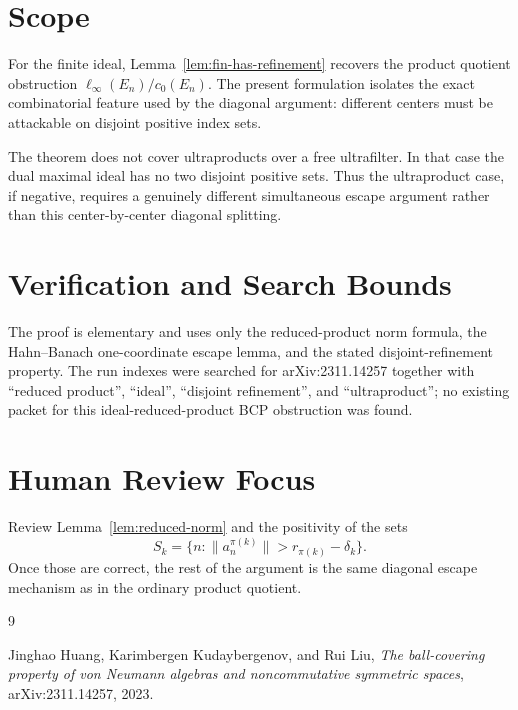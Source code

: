 \documentclass[11pt]{article}
\begin{document}
\section*{Scope}

For the finite ideal, Lemma~\ref{lem:fin-has-refinement} recovers the product
quotient obstruction
\(\ell_\infty(E_n)/c_0(E_n)\).  The present formulation isolates the exact
combinatorial feature used by the diagonal argument: different centers must be
attackable on disjoint positive index sets.

The theorem does not cover ultraproducts over a free ultrafilter.  In that
case the dual maximal ideal has no two disjoint positive sets.  Thus the
ultraproduct case, if negative, requires a genuinely different simultaneous
escape argument rather than this center-by-center diagonal splitting.

\section*{Verification and Search Bounds}

The proof is elementary and uses only the reduced-product norm formula, the
Hahn--Banach one-coordinate escape lemma, and the stated disjoint-refinement
property.  The run indexes were searched for arXiv:2311.14257 together with
``reduced product'', ``ideal'', ``disjoint refinement'', and ``ultraproduct'';
no existing packet for this ideal-reduced-product BCP obstruction was found.

\section*{Human Review Focus}

Review Lemma~\ref{lem:reduced-norm} and the positivity of the sets
\[
        S_k=\{n:\|a^{\pi(k)}_n\|>r_{\pi(k)}-\delta_k\}.
\]
Once those are correct, the rest of the argument is the same diagonal escape
mechanism as in the ordinary product quotient.

\begin{thebibliography}{9}

Jinghao Huang, Karimbergen Kudaybergenov, and Rui Liu,
\emph{The ball-covering property of von Neumann algebras and noncommutative
symmetric spaces},
arXiv:2311.14257, 2023.

\end{thebibliography}
\end{document}
